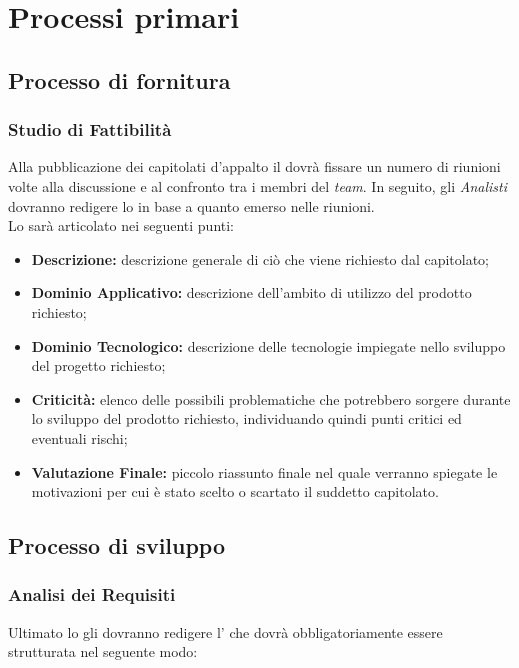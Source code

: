 \section{Processi primari}
\subsection{Processo di fornitura}

\subsubsection{Studio di Fattibilità}
Alla pubblicazione dei capitolati d'appalto il \textit{\RdP} dovrà fissare un
numero di riunioni volte alla discussione e al confronto tra i membri del \textit{team}.
In seguito, gli \textit{Analisti} dovranno redigere lo \textit{\SdF} in base a quanto
emerso nelle riunioni.\\
Lo \textit{\SdF} sarà articolato nei seguenti punti:
\begin{itemize}
	\item \textbf{Descrizione:} descrizione generale di ciò che viene richiesto
	dal capitolato;
	\item \textbf{Dominio Applicativo:} descrizione dell'ambito di utilizzo del
	prodotto richiesto;
	\item \textbf{Dominio Tecnologico:} descrizione delle tecnologie impiegate
	nello sviluppo del progetto richiesto;
	\item \textbf{Criticità:} elenco delle possibili problematiche che potrebbero
	sorgere durante lo sviluppo del prodotto richiesto, individuando quindi punti
	critici ed eventuali rischi;
	\item \textbf{Valutazione Finale:} piccolo riassunto finale nel quale verranno
	spiegate le motivazioni per cui è stato scelto o scartato il suddetto
	capitolato.
\end{itemize}

\subsection{Processo di sviluppo}
\subsubsection{Analisi dei Requisiti}
Ultimato lo \textit{\SdF} gli \textit{\Anas} dovranno redigere l'\textit{\AdR}
che dovrà obbligatoriamente essere strutturata nel seguente modo:
